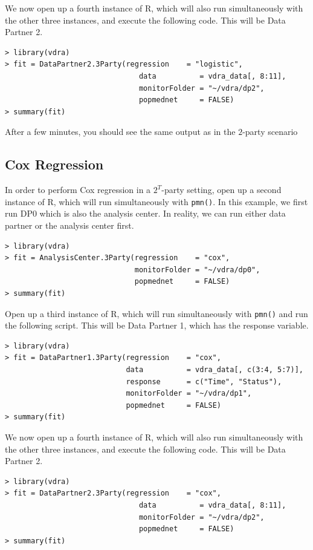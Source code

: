 \documentclass[12]{article}
\begin{document}
We now open up a fourth instance of R, which will also run simultaneously with the other three instances, and execute the following code.  This will be Data Partner 2.

\begin{verbatim}
> library(vdra)
> fit = DataPartner2.3Party(regression    = "logistic",
                               data          = vdra_data[, 8:11],
                               monitorFolder = "~/vdra/dp2",
                               popmednet     = FALSE)
> summary(fit)
\end{verbatim}

After a few minutes, you should see the same output as in the $2$-party scenario

\subsection{Cox Regression}

In order to perform Cox regression in a $2^T$-party setting, open up a second instance of R, which will run simultaneously with \verb"pmn()".  In this example, we first run DP0 which is also the analysis center.  In reality, we can run either data partner or the analysis center first.

\begin{verbatim}
> library(vdra)
> fit = AnalysisCenter.3Party(regression    = "cox",
                              monitorFolder = "~/vdra/dp0",
                              popmednet     = FALSE)
> summary(fit)
\end{verbatim}

Open up a third instance of R, which will run simultaneously with \verb"pmn()" and run the following script.  This will be Data Partner 1, which has the response variable.

\begin{verbatim}
> library(vdra)
> fit = DataPartner1.3Party(regression    = "cox",
                            data          = vdra_data[, c(3:4, 5:7)],
                            response      = c("Time", "Status"),
                            monitorFolder = "~/vdra/dp1",
                            popmednet     = FALSE)
> summary(fit)
\end{verbatim}

We now open up a fourth instance of R, which will also run simultaneously with the other three instances, and execute the following code.  This will be Data Partner 2.

\begin{verbatim}
> library(vdra)
> fit = DataPartner2.3Party(regression    = "cox",
                               data          = vdra_data[, 8:11],
                               monitorFolder = "~/vdra/dp2",
                               popmednet     = FALSE)
> summary(fit)
\end{verbatim}
\end{document}
